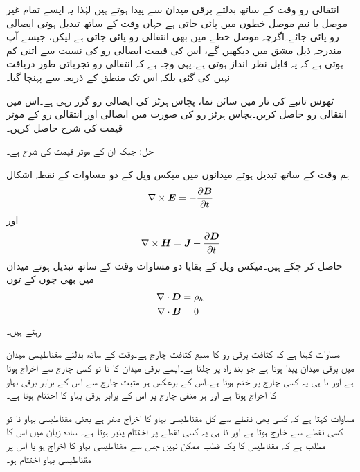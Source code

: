 انتقالی رو وقت کے ساتھ بدلتے برقی میدان سے پیدا ہوتے ہیں لہٰذا یہ ایسے تمام غیر موصل یا نیم موصل خطوں میں پائی جاتی ہے جہاں وقت کے ساتھ تبدیل ہوتی ایصالی رو پائی جائے۔اگرچہ موصل خطے میں بھی انتقالی رو پائی جاتی ہے لیکن، جیسے آپ مندرجہ ذیل مشق میں دیکھیں گے، اس کی قیمت ایصالی رو کی نسبت سے اتنی کم ہوتی ہے کہ یہ قابل نظر انداز ہوتی ہے۔یہی وجہ ہے کہ انتقالی رو تجرباتی طور دریافت نہیں کی گئی بلکہ اس تک منطق کے ذریعہ سے پہنچا گیا۔

ٹھوس تانبے کی تار میں سائن نما، پچاس ہرٹز کی ایصالی رو  گزر رہی ہے۔اس میں انتقالی رو حاصل کریں۔پچاس ہرٹز رو کی صورت میں ایصالی اور انتقالی رو کے موثر قیمت کی شرح حاصل کریں۔

حل: جبکہ ان کے موثر قیمت کی شرح   ہے۔


ہم وقت کے ساتھ تبدیل ہوتے میدانوں میں میکس ویل کے دو مساوات کے نقطہ اشکال
\begin{align}\label{مساوات-میکس_ویل_تفرقی_الف}
\nabla \times {\ensuremath{{\boldsymbol{E}}}}=-\frac{\partial {\ensuremath{{\boldsymbol{B}}}}}{\partial t}
\end{align}
اور
\begin{align}\label{مساوات-میکس_ویل_تفرقی_ب}
\nabla \times {\ensuremath{{\boldsymbol{H}}}}={{\boldsymbol{J}}}+\frac{\partial {\ensuremath{{\boldsymbol{D}}}}}{\partial t}
\end{align}
 حاصل کر چکے ہیں۔میکس ویل کے بقایا دو مساوات وقت کے ساتھ تبدیل ہوتے میدان میں بھی جوں کے توں
\begin{align}
\nabla \cdot {\ensuremath{{\boldsymbol{D}}}}&=\rho_h \label{مساوات_میکس_ویل_گاوس_قانون_نقطہ}\\
\nabla \cdot {\ensuremath{{\boldsymbol{B}}}}&=0 \label{مساوات_میکس_ویل_مقناطیسی_میدان_دو_قطب}
\end{align}
 رہتے ہیں۔ 

مساوات  کہتا ہے کہ کثافت برقی رو کا منبع کثافت چارج  ہے۔وقت کے ساتھ بدلتے مقناطیسی میدان میں برقی میدان  پیدا ہوتا ہے جو بند راہ پر چلتا ہے۔ایسے برقی میدان کا نا تو کسی چارج سے اخراج ہوتا ہے اور نا ہی یہ کسی چارج پر ختم ہوتا ہے۔اس کے برعکس ہر مثبت چارج سے اس کے برابر برقی بہاو کا اخراج ہوتا ہے اور ہر منفی چارج پر اس کے برابر برقی بہاو کا اختتام ہوتا ہے۔
  

مساوات  کہتا ہے کہ کسی بھی نقطے سے کل مقناطیسی بہاو کا اخراج صفر ہے یعنی مقناطیسی بہاو نا تو کسی نقطے سے خارج ہوتا ہے اور نا ہی یہ کسی نقطے پر اختتام پذیر ہوتا ہے۔ سادہ زبان میں اس کا مطلب ہے کہ مقناطیس کا یک قطب ممکن نہیں جس سے مقناطیسی بہاو کا اخراج ہو یا اس پر مقناطیسی بہاو اختتام ہو۔

